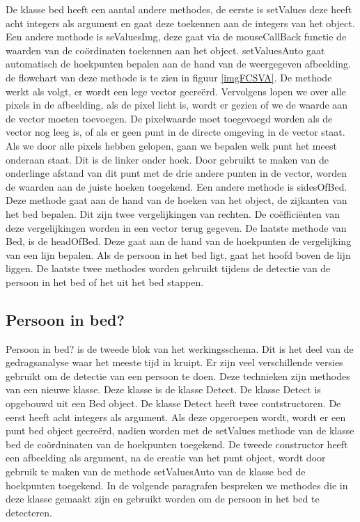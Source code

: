 De klasse bed heeft een aantal andere methodes, de eerste is setValues deze heeft acht integers als argument en gaat deze toekennen aan de integers van het object. Een andere methode is seValuesImg, deze gaat via de mouseCallBack functie de waarden van de co\"ordinaten toekennen aan het object. setValuesAuto gaat automatisch de hoekpunten bepalen aan de hand van de weergegeven afbeelding. de flowchart van deze methode is te zien in figuur \ref{imgFCSVA}. De methode werkt als volgt, er wordt een lege vector gecre\"erd. Vervolgens lopen we over alle pixels in de afbeelding, als de pixel licht is, wordt er gezien of we de waarde aan de vector moeten toevoegen. De pixelwaarde moet toegevoegd worden als de vector nog leeg is, of als er geen punt in de directe omgeving in de vector staat. Als we door alle pixels hebben gelopen, gaan we bepalen welk punt het meest onderaan staat. Dit is de linker onder hoek. Door gebruikt te maken van de onderlinge afstand van dit punt met de drie andere punten in de vector, worden de waarden aan de juiste hoeken toegekend. Een andere methode is sidesOfBed. Deze methode gaat aan de hand van de hoeken van het object, de zijkanten van het bed bepalen. Dit zijn twee vergelijkingen van rechten. De co\"effici\"enten van deze vergelijkingen worden in een vector terug gegeven. De laatste methode van Bed, is de headOfBed. Deze gaat aan de hand van de hoekpunten de vergelijking van een lijn bepalen. Als de persoon in het bed ligt, gaat het hoofd boven de lijn liggen. De laatste twee methodes worden gebruikt tijdens de detectie van de persoon in het bed of het uit het bed stappen.


\subsection{Persoon in bed?}
\label{mrefPIB}
Persoon in bed? is de tweede blok van het werkingsschema. Dit is het deel van de gedragsanalyse waar het meeste tijd in kruipt. Er zijn veel verschillende versies gebruikt om de detectie van een persoon te doen. Deze technieken zijn methodes van een nieuwe klasse. Deze klasse is de klasse Detect. De klasse Detect is opgebouwd uit een Bed object. De klasse Detect heeft twee contstructoren. De eerst heeft acht integers als argument. Als deze opgeroepen wordt, wordt er een punt bed object gecre\"erd, nadien worden met de setValues methode van de klasse bed de co\"ordninaten van de hoekpunten toegekend. De tweede constructor heeft een afbeelding als argument, na de creatie van het punt object, wordt door gebruik te maken van de methode setValuesAuto van de klasse bed de hoekpunten toegekend. In de volgende paragrafen bespreken we methodes die in deze klasse gemaakt zijn en gebruikt worden om de persoon in het bed te detecteren.

